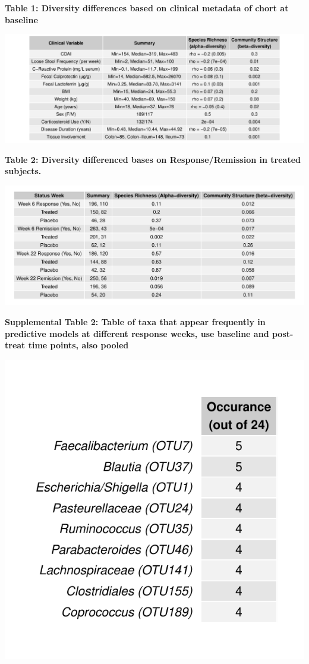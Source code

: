 \documentclass[11pt,]{article}
\begin{document}
\newpage

\textbf{Table 1: Diversity differences based on clinical metadata of
chort at baseline}

\includegraphics{tables/table1_cohortdiversity.pdf}

\newpage

\textbf{Table 2: Diversity differenced bases on Response/Remission in
treated subjects.}

\includegraphics{tables/table2diversity.pdf}

\newpage

\textbf{Supplemental Table 2: Table of taxa that appear frequently in
predictive models at different response weeks, use baseline and
post-treat time points, also pooled}

\includegraphics{tables/ST2_freqOTUs.pdf}
\end{document}
